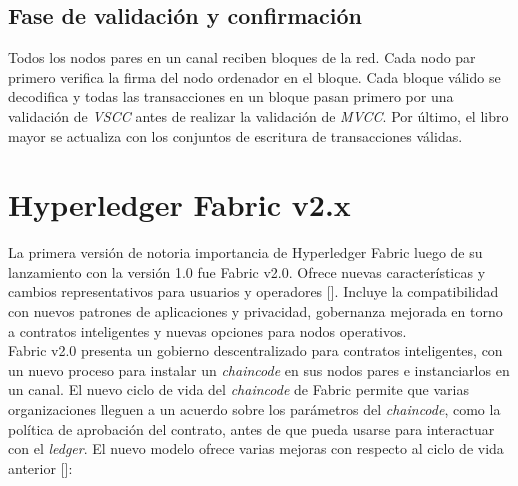 \subsection{Fase de validaci\'on y confirmaci\'on}
Todos los nodos pares en un canal reciben bloques de la red. Cada nodo par primero verifica la firma del nodo ordenador en el bloque. Cada bloque v\'alido se decodifica y todas las transacciones en un bloque pasan primero por una validaci\'on de \emph{VSCC} antes de realizar la validaci\'on de \emph{MVCC}. Por \'ultimo, el libro mayor se actualiza con los conjuntos de escritura de transacciones v\'alidas.

\section{Hyperledger Fabric v2.x}
La primera versi\'on de notoria importancia de Hyperledger Fabric luego de su lanzamiento con la versi\'on 1.0 fue Fabric v2.0. Ofrece nuevas caracter\'isticas y cambios representativos para usuarios y operadores [\cite{NewHF}]. Incluye la compatibilidad con nuevos patrones de aplicaciones y privacidad, gobernanza mejorada en torno a contratos inteligentes y nuevas opciones para nodos operativos.\\

Fabric v2.0 presenta un gobierno descentralizado para contratos inteligentes, con un nuevo proceso para instalar un \emph{chaincode} en sus nodos pares e instanciarlos en un canal. El nuevo ciclo de vida del \emph{chaincode} de Fabric permite que varias organizaciones lleguen a un acuerdo sobre los par\'ametros del \emph{chaincode}, como la pol\'itica de aprobaci\'on del contrato, antes de que pueda usarse para interactuar con el \emph{ledger}. El nuevo modelo ofrece varias mejoras con respecto al ciclo de vida anterior [\cite{hyperledger2018hyperledger}]:

